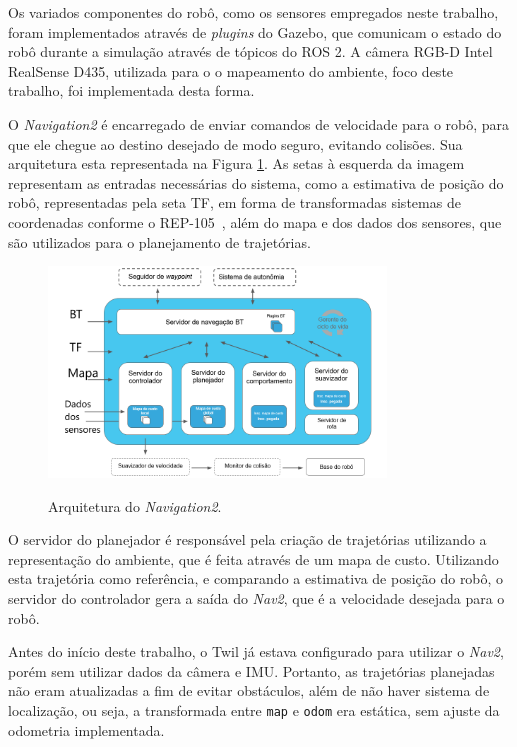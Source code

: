 \documentclass[repeatfields,xlists,xpacks,oneside,yearsonly]{ufrgscca}
\begin{document}
Os variados componentes do robô, como os sensores empregados neste
trabalho, foram implementados através de \textit{plugins} do Gazebo,
que comunicam o estado do robô durante a simulação através de tópicos
do ROS 2. A câmera RGB-D Intel RealSense D435, utilizada para o o
mapeamento do ambiente, foco deste trabalho, foi implementada desta
forma.

O \textit{Navigation2} é encarregado de enviar comandos de velocidade
para o robô, para que ele chegue ao destino desejado de modo seguro,
evitando colisões. Sua arquitetura esta representada na Figura
\ref{fig:nav2_arc}. As setas à esquerda da imagem representam as
entradas necessárias do sistema, como a estimativa de posição do
robô, representadas pela seta TF, em forma de transformadas sistemas
de coordenadas conforme o REP-105~\cite{rep_105}, além do mapa e dos
dados dos sensores, que são utilizados para o planejamento de
trajetórias.

\begin{figure}[H]
    {
        \centering
        \caption{Arquitetura do \textit{Navigation2}.}
        \label{fig:nav2_arc}
        \includegraphics[width=0.8\textwidth]{nav2_architecture_trad.png}\\
    }
    {} %
\end{figure}

O servidor do planejador é responsável pela criação de trajetórias
utilizando a representação do ambiente, que é feita através de um
mapa de custo. Utilizando esta trajetória como referência, e
comparando a estimativa de posição do robô, o servidor do controlador
gera a saída do \textit{Nav2}, que é a velocidade desejada para o
robô.

Antes do início deste trabalho, o Twil já estava configurado para
utilizar o \textit{Nav2}, porém sem utilizar dados da câmera e IMU.
Portanto, as trajetórias planejadas não eram atualizadas a fim de
evitar obstáculos, além de não haver sistema de localização, ou seja,
a transformada entre \texttt{map} e \texttt{odom} era estática, sem
ajuste da odometria implementada.
\end{document}
